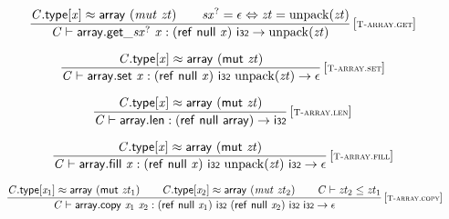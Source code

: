 $$
\begin{array}{@{}c@{}}\displaystyle
\frac{
{\mathit{C}}.\mathsf{type}{}[{\mathit{x}}] \approx \mathsf{array}~({\mathit{mut}}~{\mathit{zt}})
 \qquad
{{\mathit{sx}}^?} = \epsilon \Leftrightarrow {\mathit{zt}} = {\mathrm{unpack}}({\mathit{zt}})
}{
{\mathit{C}} \vdash {{\mathsf{array.get}}{\mathsf{\_}}}{{{\mathit{sx}}^?}}~{\mathit{x}} : (\mathsf{ref}~\mathsf{null}~{\mathit{x}})~\mathsf{i{\scriptstyle32}} \rightarrow {\mathrm{unpack}}({\mathit{zt}})
} \, {[\textsc{\scriptsize T{-}array.get}]}
\qquad
\end{array}
$$

$$
\begin{array}{@{}c@{}}\displaystyle
\frac{
{\mathit{C}}.\mathsf{type}{}[{\mathit{x}}] \approx \mathsf{array}~(\mathsf{mut}~{\mathit{zt}})
}{
{\mathit{C}} \vdash \mathsf{array.set}~{\mathit{x}} : (\mathsf{ref}~\mathsf{null}~{\mathit{x}})~\mathsf{i{\scriptstyle32}}~{\mathrm{unpack}}({\mathit{zt}}) \rightarrow \epsilon
} \, {[\textsc{\scriptsize T{-}array.set}]}
\qquad
\end{array}
$$

$$
\begin{array}{@{}c@{}}\displaystyle
\frac{
{\mathit{C}}.\mathsf{type}{}[{\mathit{x}}] \approx \mathsf{array}~(\mathsf{mut}~{\mathit{zt}})
}{
{\mathit{C}} \vdash \mathsf{array.len} : (\mathsf{ref}~\mathsf{null}~\mathsf{array}) \rightarrow \mathsf{i{\scriptstyle32}}
} \, {[\textsc{\scriptsize T{-}array.len}]}
\qquad
\end{array}
$$

$$
\begin{array}{@{}c@{}}\displaystyle
\frac{
{\mathit{C}}.\mathsf{type}{}[{\mathit{x}}] \approx \mathsf{array}~(\mathsf{mut}~{\mathit{zt}})
}{
{\mathit{C}} \vdash \mathsf{array.fill}~{\mathit{x}} : (\mathsf{ref}~\mathsf{null}~{\mathit{x}})~\mathsf{i{\scriptstyle32}}~{\mathrm{unpack}}({\mathit{zt}})~\mathsf{i{\scriptstyle32}} \rightarrow \epsilon
} \, {[\textsc{\scriptsize T{-}array.fill}]}
\qquad
\end{array}
$$

$$
\begin{array}{@{}c@{}}\displaystyle
\frac{
{\mathit{C}}.\mathsf{type}{}[{\mathit{x}}_{{1}}] \approx \mathsf{array}~(\mathsf{mut}~{\mathit{zt}}_{{1}})
 \qquad
{\mathit{C}}.\mathsf{type}{}[{\mathit{x}}_{{2}}] \approx \mathsf{array}~({\mathit{mut}}~{\mathit{zt}}_{{2}})
 \qquad
{\mathit{C}} \vdash {\mathit{zt}}_{{2}} \leq {\mathit{zt}}_{{1}}
}{
{\mathit{C}} \vdash \mathsf{array.copy}~{\mathit{x}}_{{1}}~{\mathit{x}}_{{2}} : (\mathsf{ref}~\mathsf{null}~{\mathit{x}}_{{1}})~\mathsf{i{\scriptstyle32}}~(\mathsf{ref}~\mathsf{null}~{\mathit{x}}_{{2}})~\mathsf{i{\scriptstyle32}}~\mathsf{i{\scriptstyle32}} \rightarrow \epsilon
} \, {[\textsc{\scriptsize T{-}array.copy}]}
\qquad
\end{array}
$$

